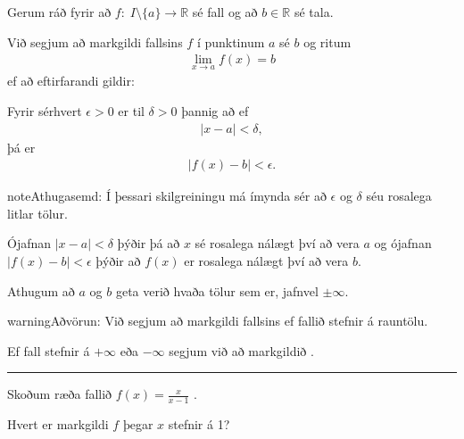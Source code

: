 \documentclass[a4paper,10pt,icelandic]{sphinxmanual}
\begin{document}
Gerum ráð fyrir að \(f:\; I\setminus\{a\}\to \mathbb{R}\) sé fall og að \(b\in \mathbb{R}\) sé tala.

Við segjum að markgildi fallsins \(f\) í punktinum \(a\) sé \(b\) og ritum
\begin{equation*}
\begin{split}\lim_{x\to a}f(x)=b\end{split}
\end{equation*}
ef að eftirfarandi gildir:

Fyrir sérhvert \(\epsilon>0\) er til \(\delta>0\) þannig að
ef
\begin{equation*}
\begin{split}|x-a|<\delta,\end{split}
\end{equation*}
þá er
\begin{equation*}
\begin{split}|f(x)-b|<\epsilon.\end{split}
\end{equation*}
\begin{sphinxadmonition}{note}{Athugasemd:}
Í þessari skilgreiningu má ímynda sér að \(\epsilon\) og \(\delta\) séu rosalega litlar tölur.

Ójafnan \(|x-a|<\delta\) þýðir þá að \(x\) sé rosalega nálægt því að vera \(a\) og ójafnan \(|f(x)-b|<\epsilon\) þýðir að \(f(x)\) er rosalega nálægt því að vera \(b\).

Athugum að \(a\) og \(b\) geta verið hvaða tölur sem er, jafnvel \(\pm \infty\).
\end{sphinxadmonition}

\begin{sphinxadmonition}{warning}{Aðvörun:}
Við segjum að markgildi fallsins  ef fallið stefnir á rauntölu.

Ef fall stefnir á \(+ \infty\) eða \(-\infty\) segjum við að markgildið  .
\end{sphinxadmonition}


\bigskip\hrule\bigskip


Skoðum ræða fallið \(f(x) = \frac{x}{x-1}\) .

\begin{figure}[htbp]
\centering

\noindent{}
\end{figure}

Hvert er markgildi \(f\) þegar \(x\) stefnir á 1?
\end{document}

